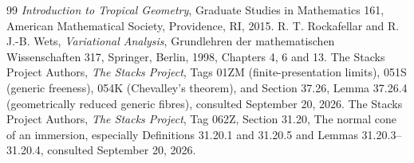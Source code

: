 \begin{thebibliography}{99}
\emph{Introduction to Tropical Geometry},
Graduate Studies in Mathematics 161,
American Mathematical Society, Providence, RI, 2015.
 R. T. Rockafellar and R. J.-B. Wets,
\emph{Variational Analysis}, Grundlehren der mathematischen
Wissenschaften 317, Springer, Berlin, 1998, Chapters 4, 6 and 13.
 The Stacks Project Authors,
\emph{The Stacks Project}, Tags 01ZM (finite-presentation limits),
051S (generic freeness), 054K (Chevalley's theorem), and
Section 37.26, Lemma 37.26.4 (geometrically reduced generic fibres),
consulted September 20, 2026.
 The Stacks Project Authors,
\emph{The Stacks Project}, Tag 062Z, Section 31.20,
The normal cone of an immersion, especially Definitions 31.20.1 and
31.20.5 and Lemmas 31.20.3--31.20.4, consulted September 20, 2026.
\end{thebibliography}
